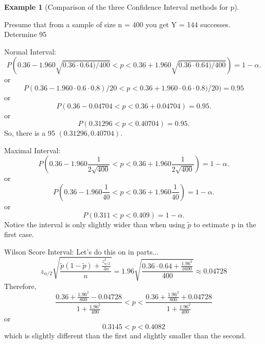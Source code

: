 \documentclass[10pt,]{book}
\theoremstyle{plain}
\theoremstyle{definition}
\theoremstyle{definition}
\newtheorem{example}[theorem]{Example}
\theoremstyle{definition}
\numberwithin{equation}{section}
\newcommand{\lt}{ < }
\begin{document}
\begin{example}[Comparison of the three Confidence Interval methods for p]\label{example-28}

Presume that from a sample of size n = 400 you get Y = 144 successes.  Determine 95%
%
\par
Normal Interval:
\begin{equation*}P( 0.36 - 1.960 \sqrt{0.36 \cdot 0.64) / 400} \lt  p \lt 0.36 + 1.960 \sqrt{0.36 \cdot 0.64) / 400}) = 1 - \alpha.\end{equation*}
or
\begin{equation*}P( 0.36 - 1.960 \cdot 0.6 \cdot 0.8) / 20 \lt  p \lt 0.36 + 1.960 \cdot 0.6 \cdot 0.8) / 20) = 0.95 \end{equation*}
or
\begin{equation*}P( 0.36 - 0.04704 \lt  p \lt 0.36 + 0.04704) = 0.95 .\end{equation*}
or
\begin{equation*}P( 0.31296 \lt  p \lt 0.40704) = 0.95 .\end{equation*}
So, there is a 95%
\((0.31296 , 0.40704).\)
%
\par
Maximal Interval:
\begin{equation*}P( 0.36 - 1.960 \frac{1}{2\sqrt{400}} \lt  p \lt 0.36 + 1.960 \frac{1}{2\sqrt{400}} ) = 1 - \alpha.\end{equation*}
or
\begin{equation*}P( 0.36 - 1.960 \frac{1}{40} \lt  p \lt 0.36 + 1.960 \frac{1}{40} ) = 1 - \alpha.\end{equation*}
or
\begin{equation*}P( 0.311 \lt  p \lt 0.409 ) = 1 - \alpha.\end{equation*}
Notice the interval is only slightly wider than when using \(\tilde{p}\) to estimate p in the first case.
%
\par
Wilson Score Interval:  Let's do this on in parts...
\begin{equation*}z_{\alpha/2} \sqrt{\frac{\tilde{p}(1-\tilde{p}) + \frac{z_{\alpha/2}^2}{4n}}{n}} = 1.96 \sqrt{ \frac{0.36 \cdot 0.64 + \frac{1.96^2}{1600}}{400}} \approx 0.04728
\end{equation*}
Therefore, 
\begin{equation*}\frac{0.36 + \frac{1.96^2}{800} - 0.04728}{1 + \frac{1.96^2}{400}} \lt p \lt \frac{0.36 + \frac{1.96^2}{800} + 0.04728}{1 + \frac{1.96^2}{400}}
\end{equation*}
or
\begin{equation*}0.3145 \lt p \lt 0.4082\end{equation*}
which is slightly different than the first and slightly smaller than the second.
%
\end{example}
\end{document}
